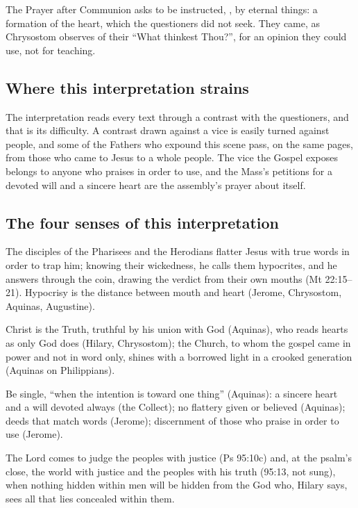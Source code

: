 The Prayer after Communion asks to be instructed, , by
eternal things: a formation of the heart, which the questioners did not seek.
They came, as Chrysostom observes of their ``What thinkest Thou?'', for an
opinion they could use, not for teaching.

\subsection{Where this interpretation strains}

The interpretation reads every text through a contrast with the questioners,
and that is its difficulty. A contrast drawn against a vice is easily turned
against people, and some of the Fathers who expound this scene pass, on the same
pages, from those who came to Jesus to a whole people. The vice the Gospel
exposes belongs to anyone who praises in order to use, and the Mass's
petitions for a devoted will and a sincere heart are the assembly's prayer
about itself.

\subsection{The four senses of this interpretation}

\begin{fourSenses}
\item[Literal.] The disciples of the Pharisees and the Herodians flatter Jesus
with true words in order to trap him; knowing their wickedness, he calls them
hypocrites, and he answers through the coin, drawing the verdict from their own
mouths (Mt 22:15--21). Hypocrisy is the distance between mouth and heart
(Jerome, Chrysostom, Aquinas, Augustine).
\item[Allegorical.] Christ is the Truth, truthful by his union with God
(Aquinas), who reads hearts as only God does (Hilary, Chrysostom); the Church,
to whom the gospel came in power and not in word only, shines with a borrowed
light in a crooked generation (Aquinas on Philippians).
\item[Moral.] Be single, ``when the intention is toward one thing'' (Aquinas):
a sincere heart and a will devoted always (the Collect); no flattery given or
believed (Aquinas); deeds that match words (Jerome); discernment of those who
praise in order to use (Jerome).
\item[Anagogical.] The Lord comes to judge the peoples with justice (Ps 95:10c)
and, at the psalm's close, the world with justice and the peoples with his
truth (95:13, not sung), when nothing hidden within men will be hidden from the God who, Hilary says, sees
all that lies concealed within them.
\end{fourSenses}
